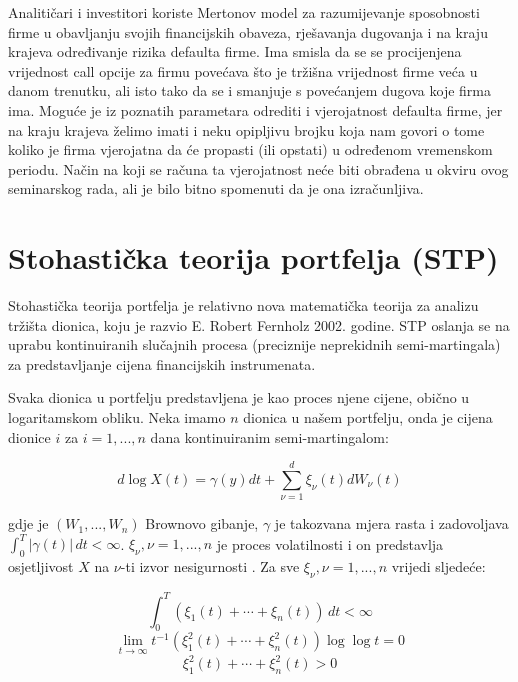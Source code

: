 \documentclass[times, utf8, seminar]{fer}
\begin{document}
Analitičari i investitori koriste Mertonov model za razumijevanje sposobnosti firme u obavljanju svojih financijskih obaveza, rješavanja dugovanja i na kraju krajeva određivanje rizika defaulta firme. Ima smisla da se se procijenjena vrijednost call opcije za firmu povećava što je tržišna vrijednost firme veća u danom trenutku, ali isto tako da se i smanjuje s povećanjem dugova koje firma ima. Moguće je iz poznatih parametara odrediti i vjerojatnost defaulta firme, jer na kraju krajeva želimo imati i neku opipljivu brojku koja nam govori o tome koliko je firma vjerojatna da će propasti (ili opstati) u određenom vremenskom periodu. Način na koji se računa ta vjerojatnost neće biti obrađena u okviru ovog seminarskog rada, ali je bilo bitno spomenuti da je ona izračunljiva.


\chapter{Stohastička teorija portfelja (STP)}
Stohastička teorija portfelja je relativno nova matematička teorija za analizu tržišta dionica, koju je razvio E. Robert Fernholz 2002. godine. STP oslanja se na uprabu kontinuiranih slučajnih procesa (preciznije neprekidnih semi-martingala) za predstavljanje cijena financijskih instrumenata.

Svaka dionica u portfelju predstavljena je kao proces njene cijene, obično u logaritamskom obliku. Neka imamo $n$ dionica u našem portfelju, onda je cijena dionice $i$ za $i=1,...,n$ dana kontinuiranim semi-martingalom:

\[ d \log X(t) = \gamma(y)dt + \sum_{\nu=1}^{d}\xi_{\nu}(t)dW_{\nu}(t) \]

gdje je $(W_1,...,W_n)$ Brownovo gibanje, $\gamma$ je takozvana mjera rasta  i zadovoljava \(\int_{0}^{T} |\gamma(t)| \,dt < \infty\). \(\xi_{\nu}, \nu = 1,...,n\) je proces volatilnosti  i on predstavlja osjetljivost \(X\) na \(\nu\)-ti izvor nesigurnosti .
Za sve \(\xi_{\nu}, \nu = 1,...,n\) vrijedi sljedeće:

\[ \int_{0}^{T} (\xi_1(t) + \cdots + \xi_n(t)) \,dt < \infty\]
\[ \lim_{t\to\infty} t^{-1}(\xi_1^2(t) + \cdots + \xi_n^2(t))\log\log t = 0 \]
\[ \xi_1^2(t) + \cdots + \xi_n^2(t) > 0 \]
\end{document}
